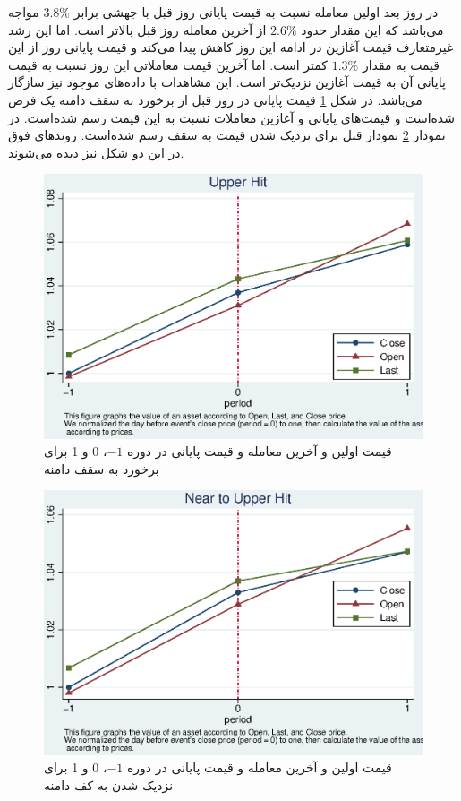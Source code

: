 \documentclass[12pt]{article}
\begin{document}
در روز بعد اولین معامله نسبت به قیمت پایانی روز قبل با جهشی برابر 
$ 3.8\% $
مواجه می‌باشد که این مقدار حدود 
$ 2.6\% $
از آخرین معامله روز قبل بالا‌تر است. اما این رشد غیرمتعارف قیمت آغازین در ادامه این روز کاهش پیدا می‌کند و قیمت پایانی روز از این قیمت به مقدار 
$ 1.3\% $
کمتر است. اما آخرین قیمت معاملاتی این روز نسبت به قیمت پایانی آن به قیمت آغازین نزدیک‌تر است.
این مشاهدات با داده‌های موجود نیز سازگار می‌باشد. در شکل 
\ref{g10}
قیمت پایانی در روز قبل از برخورد به سقف دامنه یک فرض شده‌است و قیمت‌های پایانی و آغازین معاملات نسبت به این قیمت رسم شده‌است.
در نمودار 
\ref{g31}
نمودار قبل برای نزدیک شدن قیمت به سقف رسم شده‌است. روند‌های فوق در این دو  شکل نیز دیده می‌شوند.





 \FloatBarrier
 
  \begin{figure}[htbp]
  \centering
  \includegraphics[width=0.8\columnwidth]{DUT.eps}
  \caption{ قیمت اولین  و آخرین معامله و قیمت پایانی در دوره 
   $ -1 $،
   0 
   و 
   1 
   برای برخورد به سقف دامنه}
  \label{g10}
  \end{figure}
  
  
   
            \begin{figure}[htbp]
            \centering
            \includegraphics[width=0.8\columnwidth]{DCUT.eps}
           \caption{ قیمت اولین  و آخرین معامله و قیمت پایانی در دوره 
           $ -1 $،
           0 
           و 
           1 
           برای نزدیک شدن به کف دامنه}
            \label{g31}
            \end{figure}
    
\end{document}
